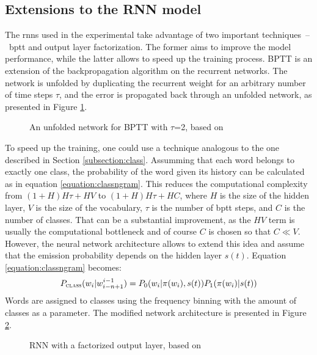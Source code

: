\subsection{Extensions to the RNN model}
The \glspl{rnn} used in the experimental take advantage of two important techniques~--~\gls{bptt} and output layer factorization. The former aims to improve the model performance, while the latter allows to speed up the training process. BPTT is an extension of the backpropagation algorithm on the recurrent networks. The network is unfolded by duplicating the recurrent weight for an arbitrary number of time steps $\tau$, and the error is propagated back through an unfolded network, as presented in Figure \ref{figure:unfolding}.

	\begin{figure}[htbp]
		\centering
		
		\caption{An unfolded network for BPTT with $\tau$=2, based on \cite{boden2002guide}}
		\label{figure:unfolding}
	\end{figure}

	To speed up the training, one could use a technique analogous to the one described in Section \ref{subsection:class}. Assumming that each word belongs to exactly one class, the probability of the word given its history can be calculated as in equation \ref{equation:classngram}. This reduces the computational complexity from $(1+H)H\tau+HV$ to $(1+H)H\tau+HC$, where $H$ is the size of the hidden layer, $V$ is the size of the vocabulary, $\tau$ is the number of \gls{bptt} steps, and $C$ is the number of classes. That can be a substantial improvement, as the $HV$ term is usually the computational bottleneck and of course $C$ is chosen so that $C\ll V$. However, the neural network architecture allows to extend this idea and assume that the emission probability depends on the hidden layer $s(t)$. Equation \ref{equation:classngram} becomes:
	\begin{equation}
		P_{\textsc{class}}(w_{i}|w_{i-n+1}^{i-1})=P_{0}(w_{i}|\pi(w_{i}), s(t))P_{1}(\pi(w_{i})|s(t))
		\label{equation:classneural}
	\end{equation}
	Words are assigned to classes using the frequency binning with the amount of classes as a parameter. The modified network architecture is presented in Figure \ref{figure:rnnclass}. 

	\begin{figure}[htbp]
		\centering
		
		\caption{RNN with a factorized output layer, based on \cite{mikolov2011extensions}}
		\label{figure:rnnclass}
	\end{figure}
	
